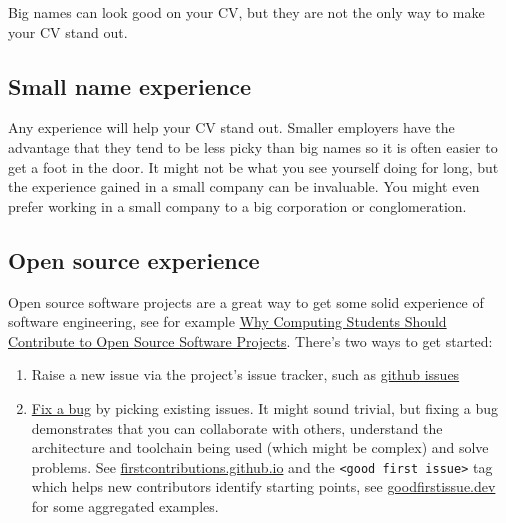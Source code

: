 \documentclass[
]{book}
\providecommand{\tightlist}{%
  \setlength{\itemsep}{0pt}\setlength{\parskip}{0pt}}
\begin{document}
Big names can look good on your CV, but they are not the only way to make your CV stand out.

\hypertarget{smallnames}{%
\subsection{Small name experience}\label{smallnames}}

Any experience will help your CV stand out. Smaller employers have the advantage that they tend to be less picky than big names so it is often easier to get a foot in the door. It might not be what you see yourself doing for long, but the experience gained in a small company can be invaluable. You might even prefer working in a small company to a big corporation or conglomeration.

\hypertarget{opensource}{%
\subsection{Open source experience}\label{opensource}}

Open source software projects are a great way to get some solid experience of software engineering, see for example \href{https://cacm.acm.org/magazines/2021/7/253459-why-computing-students-should-contribute-to-open-source-software-projects/fulltext}{Why Computing Students Should Contribute to Open Source Software Projects}. \citep{Spinellis} There's two ways to get started:

\begin{enumerate}
\def\labelenumi{\arabic{enumi}.}
\tightlist
\item
  Raise a new issue via the project's issue tracker, such as \href{https://guides.github.com/features/issues/}{github issues} \citep{githubissues}
\item
  \href{https://dev.to/rose/fixing-a-bug-on-my-open-source-project-from-start-to-finish-1749}{Fix a bug} by picking existing issues. \citep{fixabug} It might sound trivial, but fixing a bug demonstrates that you can collaborate with others, understand the architecture and toolchain being used (which might be complex) and solve problems. See \href{https://firstcontributions.github.io/}{firstcontributions.github.io} and the \texttt{\textless{}good\ first\ issue\textgreater{}} tag which helps new contributors identify starting points, see \href{https://goodfirstissue.dev/}{goodfirstissue.dev} for some aggregated examples.
\end{enumerate}
\end{document}
